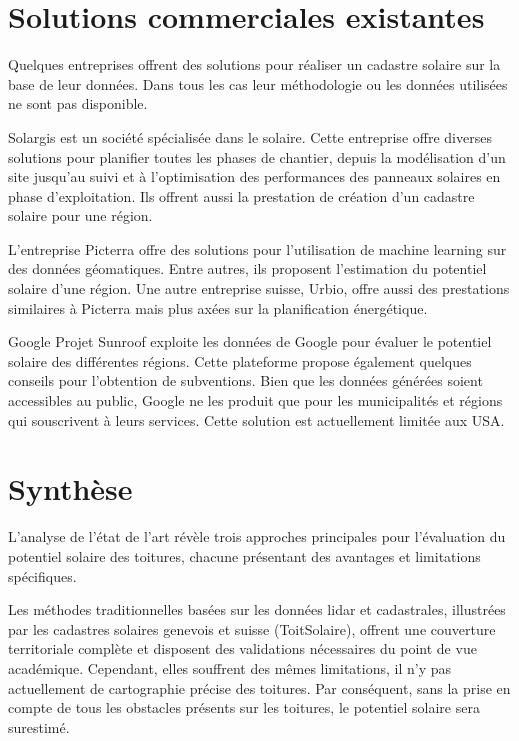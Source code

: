 \section{Solutions commerciales existantes}
\par{Quelques entreprises offrent des solutions pour réaliser un cadastre solaire sur la base de leur données. Dans tous les cas leur méthodologie ou les données utilisées ne sont pas disponible.}
\par{Solargis \cite{solargis_regional_nodate} est un société spécialisée dans le solaire. Cette entreprise offre diverses solutions pour planifier toutes les phases de chantier, depuis la modélisation d'un site jusqu'au suivi et à l'optimisation des performances des panneaux solaires en phase d'exploitation. Ils offrent aussi la prestation de création d'un cadastre solaire pour une région.}
\par{L'entreprise Picterra \cite{picterra_infrastructure_nodate} offre des solutions pour l'utilisation de machine learning sur des données géomatiques. Entre autres, ils proposent l'estimation du potentiel solaire d'une région. Une autre entreprise suisse, Urbio, \cite{urbio_urbio_nodate} offre aussi des prestations similaires à Picterra mais plus axées sur la planification énergétique.}
\par{Google Projet Sunroof \cite{google_project_nodate} exploite les données de Google pour évaluer le potentiel solaire des différentes régions. Cette plateforme propose également quelques conseils pour l'obtention de subventions. Bien que les données générées soient accessibles au public, Google ne les produit que pour les municipalités et régions qui souscrivent à leurs services. Cette solution est actuellement limitée aux USA.}

\section{Synthèse}

\par{L'analyse de l'état de l'art révèle trois approches principales pour l'évaluation du potentiel solaire des toitures, chacune présentant des avantages et limitations spécifiques.}

\par{Les méthodes traditionnelles basées sur les données \gls{lidar} et cadastrales, illustrées par les cadastres solaires genevois et suisse (ToitSolaire), offrent une couverture territoriale complète et disposent des validations nécessaires du point de vue académique. Cependant, elles souffrent des mêmes limitations, il n'y pas actuellement de cartographie précise des toitures. Par conséquent, sans la prise en compte de tous les obstacles présents sur les toitures, le potentiel solaire sera surestimé.}

